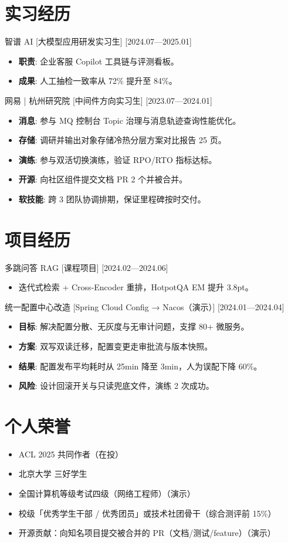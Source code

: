 \documentclass{resume-photo}
\begin{document}
\section{实习经历}
\ResumeItem
{智谱 AI}
[\textnormal{大模型应用研发实习生}]
[2024.07—2025.01]

\begin{itemize}
  \item \textbf{职责}: 企业客服 Copilot 工具链与评测看板。
  \item \textbf{成果}: 人工抽检一致率从 72\% 提升至 84\%。
\end{itemize}


\ResumeItem
{网易 | 杭州研究院}
[\textnormal{中间件方向实习生}]
[2023.07—2024.01]

\begin{itemize}
  \item \textbf{消息}: 参与 MQ 控制台 Topic 治理与消息轨迹查询性能优化。
  \item \textbf{存储}: 调研并输出对象存储冷热分层方案对比报告 25 页。
  \item \textbf{演练}: 参与双活切换演练，验证 RPO/RTO 指标达标。
  \item \textbf{开源}: 向社区组件提交文档 PR 2 个并被合并。
  \item \textbf{软技能}: 跨 3 团队协调排期，保证里程碑按时交付。
\end{itemize}



\section{项目经历}
\ResumeItem
{多跳问答 RAG}
[\textnormal{课程项目}]
[2024.02—2024.06]

\begin{itemize}
  \item 迭代式检索 + Cross-Encoder 重排，HotpotQA EM 提升 3.8pt。
\end{itemize}


\ResumeItem
{统一配置中心改造}
[\textnormal{Spring Cloud Config → Nacos（演示）}]
[2024.01—2024.04]

\begin{itemize}
  \item \textbf{目标}: 解决配置分散、无灰度与无审计问题，支撑 80+ 微服务。
  \item \textbf{方案}: 双写双读迁移，配置变更走审批流与版本快照。
  \item \textbf{结果}: 配置发布平均耗时从 25min 降至 3min，人为误配下降 60\%。
  \item \textbf{风险}: 设计回滚开关与只读兜底文件，演练 2 次成功。
\end{itemize}



\section{个人荣誉}
\begin{itemize}
  \item ACL 2025 共同作者（在投）
  \item 北京大学 三好学生
  \item 全国计算机等级考试四级（网络工程师）（演示）
  \item 校级「优秀学生干部 / 优秀团员」或技术社团骨干（综合测评前 15\%）
  \item 开源贡献：向知名项目提交被合并的 PR（文档/测试/feature）（演示）
\end{itemize}
\end{document}
